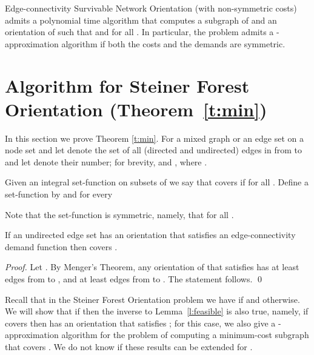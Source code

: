 \documentclass[envcountsame]{llncs}
\begin{document}
\begin{corollary} \label{c:NW}
Edge-connectivity {\sf Survivable Network Orientation} (with non-sym\-me\-tric costs) admits 
a polynomial time algorithm that computes a subgraph  of  and an orientation  of 
such that  and  
 for all . 
In particular, the problem  admits a -approximation algorithm if both 
the costs and the demands are symmetric.
\end{corollary}



\section{Algorithm for  {\sf Steiner Forest Orientation} (Theorem~\ref{t:min})}

\label{s:min}

In this section we prove Theorem \ref{t:min}. 
For a mixed graph or an edge set  on a node set  and  let
 denote the set of all (directed and undirected) edges in  from  to 
and let  denote their number;
for brevity,  and ,
where .

Given an integral set-function  on subsets of  we say that 
 covers  if  for all .
Define a set-function  by  and for every 

Note that the set-function  is symmetric, namely, that  for all .

\begin{lemma} \label{l:feasible}
If an undirected edge set  has an orientation  that satisfies an edge-connectivity demand function  then  covers . 
\end{lemma}
\begin{proof}
Let . By Menger's Theorem, any orientation  of  that satisfies 
has at least  edges from  to ,
and at least  edges from  to .
The statement follows.
\qed
\end{proof}

Recall that in the {\sf Steiner Forest Orientation} problem 
we have  if  and  otherwise. 
We will show that if 
then the inverse to Lemma~\ref{l:feasible} is also true, namely,
if  covers  then  has an orientation that satisfies ;
for this case, we also give a -approximation algorithm for the problem of computing 
a minimum-cost subgraph that covers .
We do not know if these results can be extended for .
\end{document}
